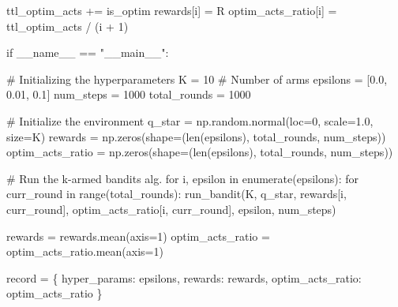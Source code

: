\documentclass[
  letterpaper,
]{krantz}
\makeatletter
\newenvironment{Shaded}{\begin{snugshade}}{\end{snugshade}}
\newcommand{\BuiltInTok}[1]{\textcolor[rgb]{0.00,0.23,0.31}{#1}}
\newcommand{\CommentTok}[1]{\textcolor[rgb]{0.37,0.37,0.37}{#1}}
\newcommand{\ControlFlowTok}[1]{\textcolor[rgb]{0.00,0.23,0.31}{#1}}
\newcommand{\DecValTok}[1]{\textcolor[rgb]{0.68,0.00,0.00}{#1}}
\newcommand{\FloatTok}[1]{\textcolor[rgb]{0.68,0.00,0.00}{#1}}
\newcommand{\KeywordTok}[1]{\textcolor[rgb]{0.00,0.23,0.31}{#1}}
\newcommand{\NormalTok}[1]{\textcolor[rgb]{0.00,0.23,0.31}{#1}}
\newcommand{\OperatorTok}[1]{\textcolor[rgb]{0.37,0.37,0.37}{#1}}
\newcommand{\StringTok}[1]{\textcolor[rgb]{0.13,0.47,0.30}{#1}}
\newcommand{\VariableTok}[1]{\textcolor[rgb]{0.07,0.07,0.07}{#1}}
\newenvironment{kframe}{%
\medskip{}
\setlength{\fboxsep}{.8em}
 \def\at@end@of@kframe{}%
 \ifinner\ifhmode%
  \def\at@end@of@kframe{\end{minipage}}%
  \begin{minipage}{\columnwidth}%
 \fi\fi%
 \def\FrameCommand##1{\hskip\@totalleftmargin \hskip-\fboxsep
 \colorbox{shadecolor}{##1}\hskip-\fboxsep
     \hskip-\linewidth \hskip-\@totalleftmargin \hskip\columnwidth}%
 \MakeFramed {\advance\hsize-\width
   \@totalleftmargin\z@ \linewidth\hsize
   \@setminipage}}%
 {\par\unskip\endMakeFramed%
 \at@end@of@kframe}
\renewenvironment{Shaded}{\begin{kframe}}{\end{kframe}}
\theoremstyle{plain}
\theoremstyle{definition}
\theoremstyle{definition}
\theoremstyle{remark}
\makeatother
\begin{document}
\begin{codelisting}
\begin{Shaded}
\begin{Highlighting}[]
\NormalTok{        ttl\_optim\_acts }\OperatorTok{+=}\NormalTok{ is\_optim}
\NormalTok{        rewards[i] }\OperatorTok{=}\NormalTok{ R}
\NormalTok{        optim\_acts\_ratio[i] }\OperatorTok{=}\NormalTok{ ttl\_optim\_acts }\OperatorTok{/}\NormalTok{ (i }\OperatorTok{+} \DecValTok{1}\NormalTok{)}


\ControlFlowTok{if} \VariableTok{\_\_name\_\_} \OperatorTok{==} \StringTok{"\_\_main\_\_"}\NormalTok{:}

    \CommentTok{\# Initializing the hyperparameters}
\NormalTok{    K }\OperatorTok{=} \DecValTok{10}  \CommentTok{\# Number of arms}
\NormalTok{    epsilons }\OperatorTok{=}\NormalTok{ [}\FloatTok{0.0}\NormalTok{, }\FloatTok{0.01}\NormalTok{, }\FloatTok{0.1}\NormalTok{]}
\NormalTok{    num\_steps }\OperatorTok{=} \DecValTok{1000}
\NormalTok{    total\_rounds }\OperatorTok{=} \DecValTok{1000}

    \CommentTok{\# Initialize the environment}
\NormalTok{    q\_star }\OperatorTok{=}\NormalTok{ np.random.normal(loc}\OperatorTok{=}\DecValTok{0}\NormalTok{, scale}\OperatorTok{=}\FloatTok{1.0}\NormalTok{, size}\OperatorTok{=}\NormalTok{K)}
\NormalTok{    rewards }\OperatorTok{=}\NormalTok{ np.zeros(shape}\OperatorTok{=}\NormalTok{(}\BuiltInTok{len}\NormalTok{(epsilons), total\_rounds, num\_steps))}
\NormalTok{    optim\_acts\_ratio }\OperatorTok{=}\NormalTok{ np.zeros(shape}\OperatorTok{=}\NormalTok{(}\BuiltInTok{len}\NormalTok{(epsilons), total\_rounds, num\_steps))}
    
    \CommentTok{\# Run the k{-}armed bandits alg.}
    \ControlFlowTok{for}\NormalTok{ i, epsilon }\KeywordTok{in} \BuiltInTok{enumerate}\NormalTok{(epsilons):}
        \ControlFlowTok{for}\NormalTok{ curr\_round }\KeywordTok{in} \BuiltInTok{range}\NormalTok{(total\_rounds):}
\NormalTok{            run\_bandit(K, q\_star, }
\NormalTok{                       rewards[i, curr\_round], }
\NormalTok{                       optim\_acts\_ratio[i, curr\_round], }
\NormalTok{                       epsilon, }
\NormalTok{                       num\_steps)}
    
\NormalTok{    rewards }\OperatorTok{=}\NormalTok{ rewards.mean(axis}\OperatorTok{=}\DecValTok{1}\NormalTok{)}
\NormalTok{    optim\_acts\_ratio }\OperatorTok{=}\NormalTok{ optim\_acts\_ratio.mean(axis}\OperatorTok{=}\DecValTok{1}\NormalTok{)}

\NormalTok{    record }\OperatorTok{=}\NormalTok{ \{}
        \StringTok{\textquotesingle{}hyper\_params\textquotesingle{}}\NormalTok{: epsilons, }
        \StringTok{\textquotesingle{}rewards\textquotesingle{}}\NormalTok{: rewards,}
        \StringTok{\textquotesingle{}optim\_acts\_ratio\textquotesingle{}}\NormalTok{: optim\_acts\_ratio}
\NormalTok{    \}}


\end{Highlighting}
\end{Shaded}
\end{codelisting}
\end{document}
